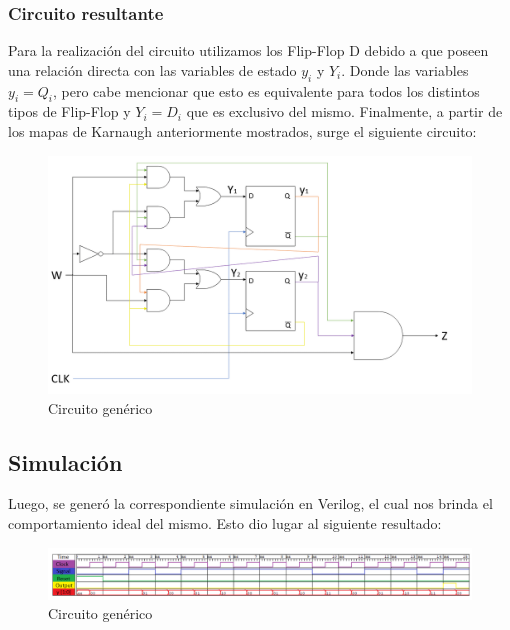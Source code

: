 \begin{center}
	\hspace*{\fill}
\end{center}
\subsubsection{Circuito resultante}
Para la realización del circuito utilizamos los Flip-Flop D debido a que poseen una relación directa con las variables de estado $y_i$ y $Y_i$. Donde las variables $y_i=Q_i$, pero cabe mencionar que esto es equivalente para todos los distintos tipos de Flip-Flop y $Y_i=D_i$ que es exclusivo del mismo.
Finalmente, a partir de los mapas de Karnaugh anteriormente mostrados, surge el siguiente circuito:\\
\begin{figure}[H]
	\centering
	\includegraphics[scale=0.4]{Ejercicio2/Circuito.png}
	\caption{Circuito genérico}
\end{figure}
\subsection{Simulación}
Luego, se generó la correspondiente simulación en Verilog, el cual nos brinda el comportamiento ideal del mismo. Esto dio lugar al siguiente resultado:\\
\begin{figure}[H]
	\centering
	\includegraphics[scale=0.5]{Ejercicio2/Simulacion.png}
	\caption{Circuito genérico}
\end{figure}